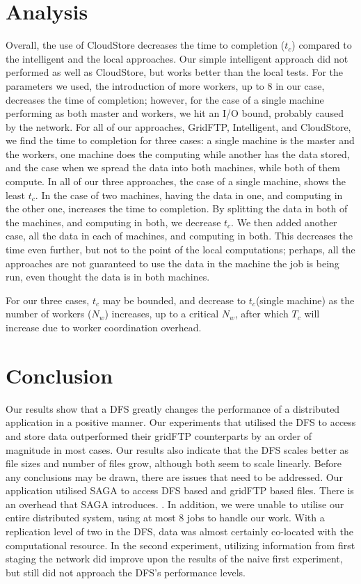 \documentclass{rspublic}
\begin{document}
%

\section{Analysis}

Overall, the use of CloudStore decreases the time to completion
($t_c$) compared to the intelligent and the local approaches. Our
simple intelligent approach did not performed as well as CloudStore, but
works better than the local tests. For the parameters we used, the
introduction of more workers, up to 8 in our case, decreases the time of
completion; however, for the case of a single machine performing as both
master and workers, we hit an I/O bound, probably caused by the network.
For all of our approaches, GridFTP, Intelligent, and CloudStore, we find
the time to completion for three cases: a single machine is the master
and the workers, one machine does the computing while another has the
data stored, and the case when we spread the data into both machines,
while both of them compute.  In all of our three approaches, the case of
a single machine, shows the least $t_c$. In the case of two machines,
having the data in one, and computing in the other one, increases the
time to completion. By splitting the data in both of the machines, and
computing in both, we decrease $t_c$. We then added another case, all
the data in each of machines, and computing in both. This decreases the
time even further, but not to the point of the local computations;
perhaps, all the approaches are not guaranteed to use the data in the
machine the job is being run, even thought the data is in both machines.

For our three cases,  $t_c$ may be bounded, and decrease to $t_c$(single
machine) as  the number of workers ($N_w$) increases, up to a critical
$N_w$, after which $T_c$ will increase due to worker coordination
overhead.




\section{Conclusion} Our results show that a DFS greatly changes the
performance of a distributed application in a positive manner. Our
experiments that utilised the DFS to access and store data outperformed
their gridFTP counterparts by an order of magnitude in most cases. Our
results also indicate that the DFS scales better as file sizes and
number of files grow, although both seem to scale linearly. Before any
conclusions may be drawn, there are issues that need to be addressed.
Our application utilised SAGA to access DFS based and gridFTP based
files. There is an overhead that SAGA introduces.  .  In addition, we
were unable to utilise our entire distributed system, using at most 8
jobs to handle our work.  With a replication level of two in the DFS,
data was almost certainly co-located with the computational resource. In
the second experiment, utilizing information from first staging the
network did improve upon the results of the naive first experiment, but
still did not approach the DFS's performance levels.
\end{document}
